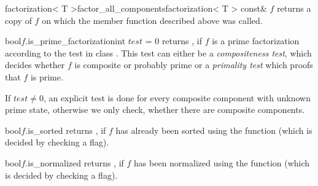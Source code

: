 
\begin{fcode}{factorization< T >}{factor_all_components}{factorization< T >
    const& $f$}
  returns a copy of $f$ on which the member function  described
  above was called.
\end{fcode}



\begin{fcode}{bool}{$f$.is_prime_factorization}{int $\mathit{test}$ = 0}
  returns \TRUE, if $f$ is a prime factorization according to the test in class
  .  This test can either be a \emph{compositeness test}, which decides
  whether $f$ is composite or probably prime or a \emph{primality test} which proofs that $f$ is
  prime.
  
  If $\mathit{test} \neq 0$, an explicit test is done for every composite component with unknown
  prime state, otherwise we only check, whether there are composite components.
\end{fcode}


\begin{fcode}{bool}{$f$.is_sorted}{}
  returns \TRUE, if $f$ has already been sorted using the function  (which is
  decided by checking a flag).
\end{fcode}


\begin{fcode}{bool}{$f$.is_normalized}{}
  returns \TRUE, if $f$ has been normalized using the function  (which is
  decided by checking a flag).
\end{fcode}


